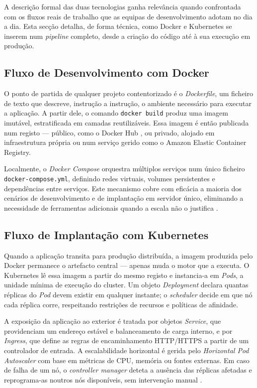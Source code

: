 \documentclass[conference]{IEEEtran}
\begin{document}
A descrição formal das duas tecnologias ganha relevância quando confrontada com os fluxos reais de trabalho que as equipas de desenvolvimento adotam no dia a dia. Esta secção detalha, de forma técnica, como Docker e Kubernetes se inserem num \textit{pipeline} completo, desde a criação do código até à sua execução em produção.

\subsection{Fluxo de Desenvolvimento com Docker}

O ponto de partida de qualquer projeto contentorizado é o \textit{Dockerfile}, um ficheiro de texto que descreve, instrução a instrução, o ambiente necessário para executar a aplicação. A partir dele, o comando \texttt{docker build} produz uma imagem imutável, estratificada em camadas reutilizáveis. Essa imagem é então publicada num registo — público, como o Docker Hub \cite{dockerdocs}, ou privado, alojado em infraestrutura própria ou num serviço gerido como o Amazon Elastic Container Registry.

Localmente, o \textit{Docker Compose} orquestra múltiplos serviços num único ficheiro \texttt{docker-compose.yml}, definindo redes virtuais, volumes persistentes e dependências entre serviços. Este mecanismo cobre com eficácia a maioria dos cenários de desenvolvimento e de implantação em servidor único, eliminando a necessidade de ferramentas adicionais quando a escala não o justifica \cite{pahl2019}.

\subsection{Fluxo de Implantação com Kubernetes}

Quando a aplicação transita para produção distribuída, a imagem produzida pelo Docker permanece o artefacto central — apenas muda o motor que a executa. O Kubernetes lê essa imagem a partir do mesmo registo e instancia-a em \textit{Pods}, a unidade mínima de execução do cluster. Um objeto \textit{Deployment} declara quantas réplicas do \textit{Pod} devem existir em qualquer instante; o \textit{scheduler} decide em que nó cada réplica corre, respeitando restrições de recursos e políticas de afinidade.

A exposição da aplicação ao exterior é tratada por objetos \textit{Service}, que providenciam um endereço estável e balanceamento de carga interno, e por \textit{Ingress}, que define as regras de encaminhamento HTTP/HTTPS a partir de um controlador de entrada. A escalabilidade horizontal é gerida pelo \textit{Horizontal Pod Autoscaler} com base em métricas de CPU, memória ou fontes externas. Em caso de falha de um nó, o \textit{controller manager} deteta a ausência das réplicas afetadas e reprograma-as noutros nós disponíveis, sem intervenção manual \cite{burns2016,k8sdocs}.
\end{document}
